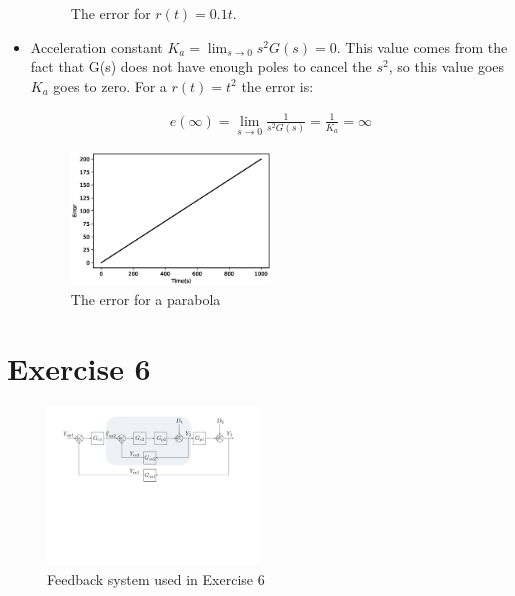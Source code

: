 \documentclass[a4paper]{article}
\begin{document}
\begin{itemize}
\begin{multicols}{2}
\begin{figure}[H]
    \caption{The error for $r(t)=0.1t$.}
    \label{fig:EXE_error}
\end{figure}
\end{multicols}
	\item Acceleration constant $K_a = \lim_{s\rightarrow 0}s^2G(s)=0$. This value comes from the fact that G(s) does not have enough poles to cancel the $s^2$, so this value goes $K_a$ goes to zero. For a $r(t)=t^2$ the error is:
	\vspace{-1em}	
	\begin{multicols}{2}	
	\begin{align*}
    e(\infty)=\lim_{s\rightarrow 0}\frac{1}{s^2G(s)}=\frac{1}{K_a}=\infty
    \end{align*}
    \columnbreak	
	\begin{figure}[H]
    \centering
    \includegraphics[width=0.5\textwidth]{Figures/Question5/EXE_5_parabola_error.eps}
    \caption{The error for a parabola}
    \label{fig:EXE_error}
\end{figure}
\end{multicols}
\end{itemize}
\section*{Exercise 6}
\begin{figure}[H] \begin{center}
\includegraphics [width=0.5\textwidth] {Figures/FromMichela/Question6_Figure_1.pdf} \vskip-0.4cm
\caption{Feedback system used in Exercise 6}
\label{fig:ex6}
\end{center}
\end{figure}
\end{document}
